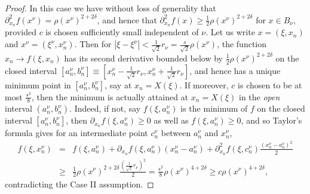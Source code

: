 \documentclass{amsart}
\theoremstyle{plain}
\numberwithin{equation}{section}
\begin{document}
\begin{proof}
\medskip

In this case we have without loss of generality that $\partial
_{x_{n}}^{2}f\left( x^{\nu }\right) =\rho \left( x^{\nu }\right) ^{2+2\delta
}$, and hence that $\partial _{x_{n}}^{2}f\left( x\right) \geq \frac{1}{2}%
\rho \left( x^{\nu }\right) ^{2+2\delta }$ for $x\in B_{\nu }$, provided $c$
is chosen sufficiently small independent of $\nu $. Let us write $x=\left(
\xi ,x_{n}\right) $ and $x^{\nu }=\left( \xi ^{\nu },x_{n}^{\nu }\right) $.
Then for $\left\vert \xi -\xi ^{\nu }\right\vert <\frac{1}{\sqrt{2}}r_{\nu }=%
\frac{s}{\sqrt{2}}\rho \left( x^{\nu }\right) $, the function $%
x_{n}\rightarrow f\left( \xi ,x_{n}\right) $ has its second derivative
bounded below by $\frac{1}{2}\rho \left( x^{\nu }\right) ^{2+2\delta }$ on
the closed interval $\left[ a_{n}^{\nu },b_{n}^{\nu }\right] \equiv \left[
x_{n}^{\nu }-\frac{1}{\sqrt{2}}r_{\nu },x_{n}^{\nu }+\frac{1}{\sqrt{2}}%
r_{\nu }\right] $, and hence has a unique minimum point in $\left[
a_{n}^{\nu },b_{n}^{\nu }\right] $, say at $x_{n}=X\left( \xi \right) $. If
moreover, $c$ is chosen to be at most $\frac{s^{2}}{8}$, then the minimum is
actually attained at $x_{n}=X\left( \xi \right) $ in the \emph{open}
interval $\left( a_{n}^{\nu },b_{n}^{\nu }\right) $. Indeed, if not, say $%
f\left( \xi ,a_{n}^{\nu }\right) $ is the minimum of $f$ on the closed
interval $\left[ a_{n}^{\nu },b_{n}^{\nu }\right] $, then $\partial
_{x_{n}}f\left( \xi ,a_{n}^{\nu }\right) \geq 0$ as well as $f\left( \xi
,a_{n}^{\nu }\right) \geq 0$, and so Taylor's formula gives for an
intermediate point $c_{n}^{\nu }$ between $a_{n}^{\nu }$ and $x_{n}^{\nu }$,%
\begin{eqnarray*}
f\left( \xi ,x_{n}^{\nu }\right) &=&f\left( \xi ,a_{n}^{\nu }\right)
+\partial _{x_{n}}f\left( \xi ,a_{n}^{\nu }\right) \left( x_{n}^{\nu
}-a_{n}^{\nu }\right) +\partial _{x_{n}}^{2}f\left( \xi ,c_{n}^{\nu }\right) 
\frac{\left( x_{n}^{\nu }-a_{n}^{\nu }\right) ^{2}}{2} \\
&\geq &\frac{1}{2}\rho \left( x^{\nu }\right) ^{2+2\delta }\frac{\left( 
\frac{1}{\sqrt{2}}r_{\nu }\right) ^{2}}{2}=\frac{s^{2}}{8}\rho \left( x^{\nu
}\right) ^{4+2\delta }\geq c\rho \left( x^{\nu }\right) ^{4+2\delta },
\end{eqnarray*}%
contradicting the Case II assumption.


\end{proof}
\end{document}

